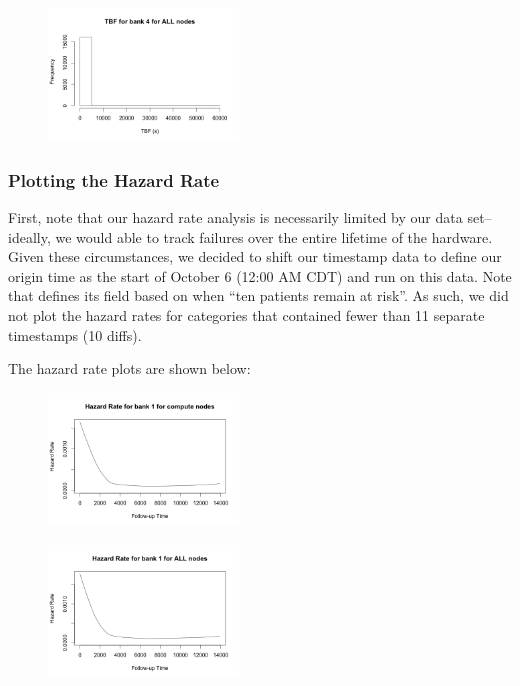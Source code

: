 \begin{t able}[t]
\begin{figure}
\centering
\includegraphics[width=0.45\textwidth]{images/tbf_4_a.png}
\end{figure}

\subsubsection{Plotting the Hazard Rate}

First, note that our hazard rate analysis is necessarily limited by our data set--ideally, we would able to track failures over the entire lifetime of the hardware.  Given these circumstances, we decided to shift our timestamp data to define our origin time as the start of October 6 (12:00 AM CDT) and run  on this data.  Note that  defines its  field based on when ``ten patients remain at risk''\cite{MUHAZ}.  As such, we did not plot the hazard rates for categories that contained fewer than 11 separate timestamps (10 diffs).

The hazard rate plots are shown below:

\begin{figure}
\centering
\includegraphics[width=0.45\textwidth]{images/haz_1_c.png}
\end{figure}

\begin{figure}
\centering
\includegraphics[width=0.45\textwidth]{images/haz_1_a.png}
\end{figure}


\end{t able}
